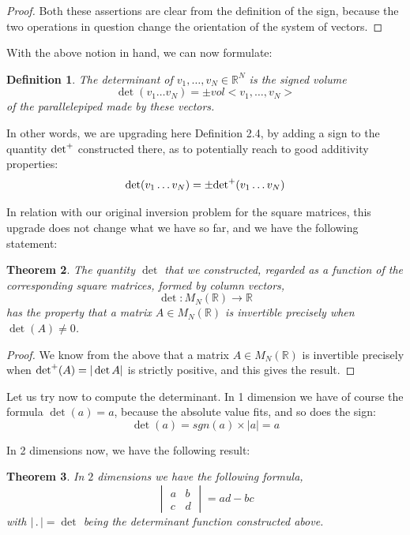\documentclass[12pt]{amsbook}
\newtheorem{theorem}{Theorem}[chapter]
\newtheorem{definition}[theorem]{Definition}
\begin{document}
\begin{proof}
Both these assertions are clear from the definition of the sign, because the two operations in question change the orientation of the system of vectors.
\end{proof}

With the above notion in hand, we can now formulate:


\begin{definition}
The determinant of $v_1,\ldots,v_N\in\mathbb R^N$ is the signed volume
$$\det(v_1\ldots v_N)=\pm vol<v_1,\ldots,v_N>$$
of the parallelepiped made by these vectors.
\end{definition}

In other words, we are upgrading here Definition 2.4, by adding a sign to the quantity ${\rm det}^+$ constructed there, as to potentially reach to good additivity properties:
$$\det(v_1\ldots v_N)=\pm {\rm det}^+(v_1\ldots v_N)$$

In relation with our original inversion problem for the square matrices, this upgrade does not change what we have so far, and we have the following statement:


\begin{theorem}
The quantity $\det$ that we constructed, regarded as a function of the corresponding square matrices, formed by column vectors,
$$\det:M_N(\mathbb R)\to\mathbb R$$
has the property that a matrix $A\in M_N(\mathbb R)$ is invertible precisely when $\det(A)\neq 0$.
\end{theorem}

\begin{proof}
We know from the above that a matrix $A\in M_N(\mathbb R)$ is invertible precisely when ${\rm det}^+(A)=|\det A|$ is strictly positive, and this gives the result.
\end{proof}

Let us try now to compute the determinant. In 1 dimension we have of course the formula $\det(a)=a$, because the absolute value fits, and so does the sign:
$$\det(a)
=sgn(a)\times|a|
=a$$

In 2 dimensions now, we have the following result:

\begin{theorem}
In $2$ dimensions we have the following formula,
$$\begin{vmatrix}a&b\\ c&d\end{vmatrix}=ad-bc$$
with $|\,.\,|=\det$ being the determinant function constructed above.
\end{theorem}
\end{document}
